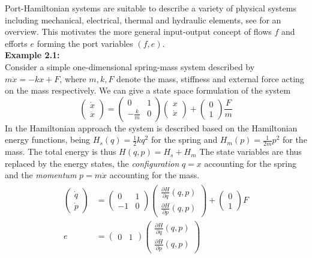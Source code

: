 \documentclass[a4paper,twoside, openright,12pt]{report}
\begin{document}
Port-Hamiltonian systems are suitable to describe a variety of physical systems including mechanical, electrical, thermal and hydraulic elements, see \cite{duindam2009geoplexbook} for an overview. This motivates the more general input-output concept of flows $f$ and efforts $e$ forming the port variables $(f,e)$.\\
\textbf{Example 2.1:}\\
Consider a simple one-dimensional spring-mass system described by $ m\ddot{x} = -kx +F $, where $ m,k,F $ denote the mass, stiffness and external force acting on the mass respectively. We can give a state space formulation of the system
\begin{equation}
	\begin{pmatrix}\dot{x} \\ \ddot{x}\end{pmatrix} =
	\begin{pmatrix}0 & 1 \\ -\frac{k}{m} & 0\end{pmatrix}
	\begin{pmatrix}x \\ \dot{x}\end{pmatrix} + 
	\begin{pmatrix}0 \\ 1\end{pmatrix}\frac{F}{m}
\end{equation}
In the Hamiltonian approach the system is described based on the Hamiltonian energy functions, being $ H_s(q) = \frac{1}{2}kq^2 $ for the spring and $ H_m(p) = \frac{1}{2m}p^2 $ for the mass. The total energy is thus $H(q,p) = H_s + H_m$ The state variables are thus replaced by the energy states, the \emph{configuration} $q=x$ accounting for the spring and the \emph{momentum} $p=m\dot{x}$ accounting for the mass.  
\begin{eqnarray}\label{EQ:HSexample}
\begin{aligned}
	\begin{pmatrix}\dot{q} \\ \dot{p}\end{pmatrix} &=
	\begin{pmatrix}0 & 1 \\ -1 & 0\end{pmatrix}
	\begin{pmatrix}\frac{\partial H}{\partial q}(q,p) \\ \frac{\partial H}{\partial p}(q,p)\end{pmatrix} + 
	\begin{pmatrix}0 \\ 1\end{pmatrix} F\\
	e &= \begin{pmatrix}	0 & 1\end{pmatrix}\begin{pmatrix}\frac{\partial H}{\partial q}(q,p) \\ \frac{\partial H}{\partial p}(q,p)\end{pmatrix}
	\end{aligned}
\end{eqnarray}
\end{document}
